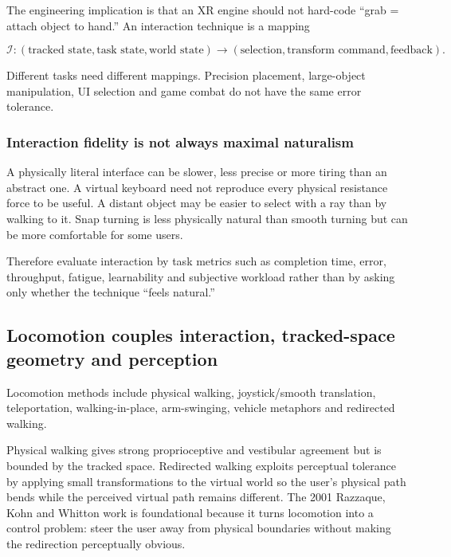 The engineering implication is that an XR engine should not hard-code ``grab = attach object to hand.'' An interaction technique is a mapping

\[
\mathcal I:
(\text{tracked state},\text{task state},\text{world state})
\rightarrow
(\text{selection},\text{transform command},\text{feedback}).
\]

Different tasks need different mappings. Precision placement, large-object manipulation, UI selection and game combat do not have the same error tolerance.

\subsubsection{Interaction fidelity is not always maximal naturalism}\label{04-visual-computing-ii-ch035-interaction-fidelity-is-not-always-maximal-naturalism}

A physically literal interface can be slower, less precise or more tiring than an abstract one. A virtual keyboard need not reproduce every physical resistance force to be useful. A distant object may be easier to select with a ray than by walking to it. Snap turning is less physically natural than smooth turning but can be more comfortable for some users.

Therefore evaluate interaction by task metrics such as completion time, error, throughput, fatigue, learnability and subjective workload rather than by asking only whether the technique ``feels natural.''

\subsection{Locomotion couples interaction, tracked-space geometry and perception}\label{04-visual-computing-ii-ch035-locomotion-couples-interaction-tracked-space-geometry-and-perception}

Locomotion methods include physical walking, joystick/smooth translation, teleportation, walking-in-place, arm-swinging, vehicle metaphors and redirected walking.

Physical walking gives strong proprioceptive and vestibular agreement but is bounded by the tracked space. Redirected walking exploits perceptual tolerance by applying small transformations to the virtual world so the user's physical path bends while the perceived virtual path remains different. The 2001 Razzaque, Kohn and Whitton work is foundational because it turns locomotion into a control problem: steer the user away from physical boundaries without making the redirection perceptually obvious.

